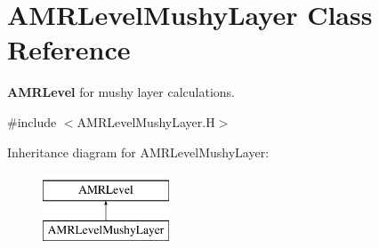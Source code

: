 \hypertarget{class_a_m_r_level_mushy_layer}{}\section{A\+M\+R\+Level\+Mushy\+Layer Class Reference}
\label{class_a_m_r_level_mushy_layer}


\textbf{ A\+M\+R\+Level} for mushy layer calculations.  




{\ttfamily \#include $<$A\+M\+R\+Level\+Mushy\+Layer.\+H$>$}

Inheritance diagram for A\+M\+R\+Level\+Mushy\+Layer\+:\begin{figure}[H]
\begin{center}
\leavevmode
\includegraphics[height=2.000000cm]{class_a_m_r_level_mushy_layer}
\end{center}
\end{figure}
